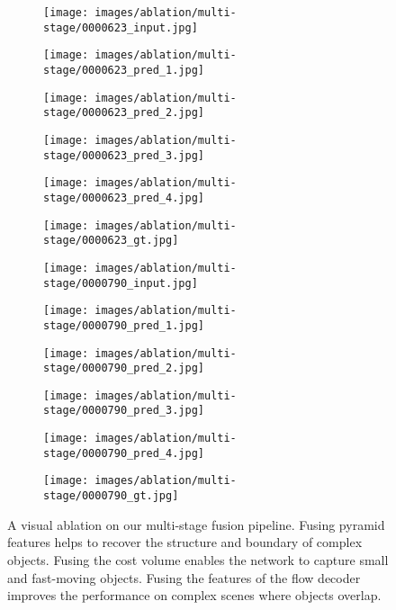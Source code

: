 \documentclass[10pt,twocolumn,letterpaper]{article}
\begin{document}
\begin{figure*}
    \begin{subfigure}[b]{0.166\linewidth}
    \texttt{[image: images/ablation/multi-stage/0000623\_input.jpg]}
    \end{subfigure}\hfill
    \begin{subfigure}[b]{0.166\linewidth}
    \texttt{[image: images/ablation/multi-stage/0000623\_pred\_1.jpg]}
    \end{subfigure}\hfill
    \begin{subfigure}[b]{0.166\linewidth}
    \texttt{[image: images/ablation/multi-stage/0000623\_pred\_2.jpg]}
    \end{subfigure}\hfill
    \begin{subfigure}[b]{0.166\linewidth}
    \texttt{[image: images/ablation/multi-stage/0000623\_pred\_3.jpg]}
    \end{subfigure}\hfill
    \begin{subfigure}[b]{0.166\linewidth}
    \texttt{[image: images/ablation/multi-stage/0000623\_pred\_4.jpg]}
    \end{subfigure}\hfill
    \begin{subfigure}[b]{0.166\linewidth}
    \texttt{[image: images/ablation/multi-stage/0000623\_gt.jpg]}
    \end{subfigure}\hfill
    
    \begin{subfigure}[b]{0.166\linewidth}
    \texttt{[image: images/ablation/multi-stage/0000790\_input.jpg]}
    \end{subfigure}\hfill
    \begin{subfigure}[b]{0.166\linewidth}
    \texttt{[image: images/ablation/multi-stage/0000790\_pred\_1.jpg]}
    \end{subfigure}\hfill
    \begin{subfigure}[b]{0.166\linewidth}
    \texttt{[image: images/ablation/multi-stage/0000790\_pred\_2.jpg]}
    \end{subfigure}\hfill
    \begin{subfigure}[b]{0.166\linewidth}
    \texttt{[image: images/ablation/multi-stage/0000790\_pred\_3.jpg]}
    \end{subfigure}\hfill
    \begin{subfigure}[b]{0.166\linewidth}
    \texttt{[image: images/ablation/multi-stage/0000790\_pred\_4.jpg]}
    \end{subfigure}\hfill
    \begin{subfigure}[b]{0.166\linewidth}
    \texttt{[image: images/ablation/multi-stage/0000790\_gt.jpg]}
    \end{subfigure}\hfill
    \caption{A visual ablation on our multi-stage fusion pipeline. Fusing pyramid features helps to recover the structure and boundary of complex objects. Fusing the cost volume enables the network to capture small and fast-moving objects. Fusing the features of the flow decoder improves the performance on complex scenes where objects overlap.}
    \label{fig:multi-stage-ablation}
\end{figure*}
\end{document}
